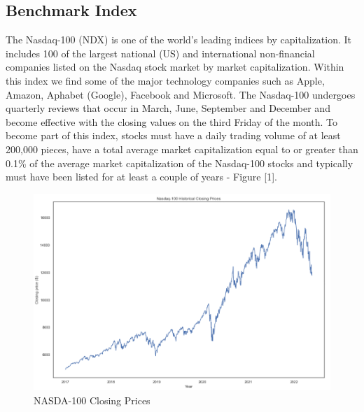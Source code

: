 \documentclass[twocolumn]{article}
\begin{document}
\subsection{Benchmark Index}
The Nasdaq-100 (NDX) is one of the world's leading indices by capitalization. It includes 100 of the largest national (US) and international non-financial companies listed on the Nasdaq stock market by market capitalization. Within this index we find some of the major technology companies such as Apple, Amazon, Aphabet (Google), Facebook and Microsoft. The Nasdaq-100 undergoes quarterly reviews that occur in March, June, September and December and become effective with the closing values on the third Friday of the month. To become part of this index, stocks must have a daily trading volume of at least 200,000 pieces, have a total average market capitalization equal to or greater than 0.1\% of the average market capitalization of the Nasdaq-100 stocks and typically must have been listed for at least a couple of years - Figure [1].
\begin{figure}[b]
\centering 
\includegraphics[scale=0.5]{ndx.png}
\caption{NASDA-100 Closing Prices}
\end{figure}
\end{document}
